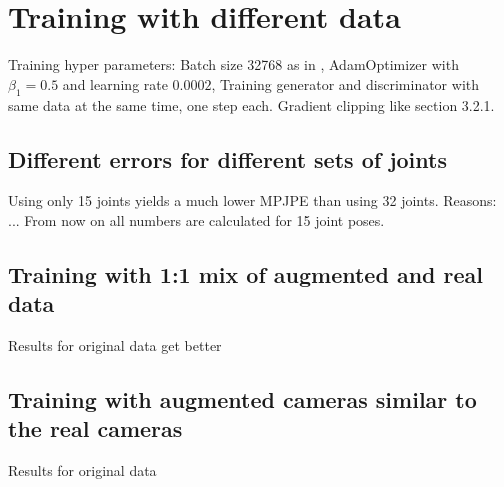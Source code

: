 \section{Training with different data}

Training hyper parameters:
Batch size 32768 as in \cite{drover18}, AdamOptimizer with $\beta_1 = 0.5$ and learning rate $0.0002$, Training generator and discriminator with same data at the same time, one step each. Gradient clipping like \citet{chorowski14} section 3.2.1.


\subsection{Different errors for different sets of joints}
Using only 15 joints yields a much lower MPJPE than using 32 joints. Reasons: ...	
From now on all numbers are calculated for 15 joint poses.

\subsection{Training with 1:1 mix of augmented and real data}
Results for original data get better



\subsection{Training with augmented cameras similar to the real cameras}
Results for original data